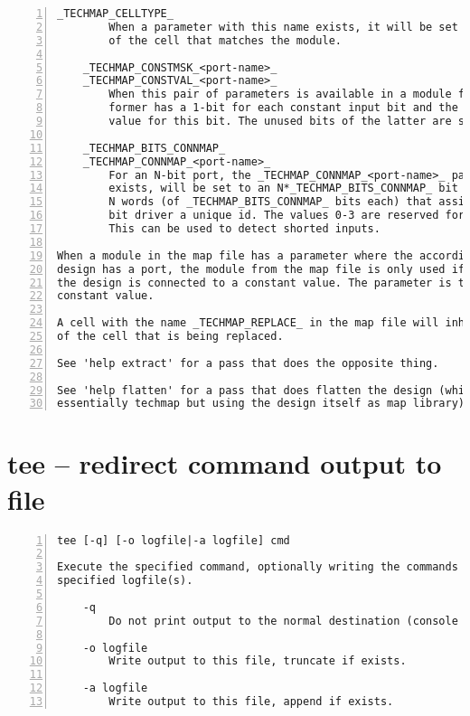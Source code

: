 \begin{lstlisting}[numbers=left,frame=single]
    _TECHMAP_CELLTYPE_
        When a parameter with this name exists, it will be set to the type name
        of the cell that matches the module.

    _TECHMAP_CONSTMSK_<port-name>_
    _TECHMAP_CONSTVAL_<port-name>_
        When this pair of parameters is available in a module for a port, then
        former has a 1-bit for each constant input bit and the latter has the
        value for this bit. The unused bits of the latter are set to undef (x).

    _TECHMAP_BITS_CONNMAP_
    _TECHMAP_CONNMAP_<port-name>_
        For an N-bit port, the _TECHMAP_CONNMAP_<port-name>_ parameter, if it
        exists, will be set to an N*_TECHMAP_BITS_CONNMAP_ bit vector containing
        N words (of _TECHMAP_BITS_CONNMAP_ bits each) that assign each single
        bit driver a unique id. The values 0-3 are reserved for 0, 1, x, and z.
        This can be used to detect shorted inputs.

When a module in the map file has a parameter where the according cell in the
design has a port, the module from the map file is only used if the port in
the design is connected to a constant value. The parameter is then set to the
constant value.

A cell with the name _TECHMAP_REPLACE_ in the map file will inherit the name
of the cell that is being replaced.

See 'help extract' for a pass that does the opposite thing.

See 'help flatten' for a pass that does flatten the design (which is
essentially techmap but using the design itself as map library).
\end{lstlisting}

\section{tee -- redirect command output to file}
\label{cmd:tee}
\begin{lstlisting}[numbers=left,frame=single]
    tee [-q] [-o logfile|-a logfile] cmd

Execute the specified command, optionally writing the commands output to the
specified logfile(s).

    -q
        Do not print output to the normal destination (console and/or log file)

    -o logfile
        Write output to this file, truncate if exists.

    -a logfile
        Write output to this file, append if exists.
\end{lstlisting}

